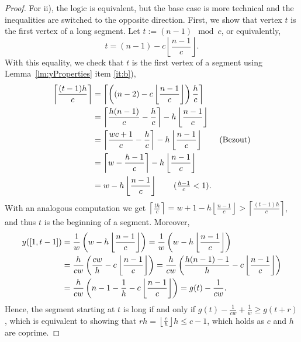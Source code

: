 \documentclass[11pt]{article}
\newcommand\+{\mkern2mu}
\newcommand{\floor}[1]{\left\lfloor #1 \right\rfloor}
\newcommand{\ceil}[1]{\left\lceil #1 \right\rceil}
\begin{document}
\begin{proof}
    For ii), the logic is equivalent, but the base case is more technical and the inequalities are switched to the opposite direction. First, we show that vertex $t$ is the first vertex of a long segment. Let $t:=(n-1) \mod c$, or equivalently, 
    $$t  = (n-1) - c \floor{\frac{n-1}{c}}.$$
    With this equality, we check that $t$ is the first vertex of a segment using Lemma~\ref{lm:yProperties} item \ref{it:b}),
    \begin{align*}
        \ceil{ \frac{(t-1)h}{c}} &= \ceil{\left((n-2) - c \floor{\frac{n-1}{c}} \right)\frac{h}{c}} \\
        &= \ceil{\frac{h(n-1)}{c} - \frac{h}{c}} - h \floor{\frac{n-1}{c}} \\
        &= \ceil{\frac{wc + 1}{c} - \frac{h}{c}} - h \floor{\frac{n-1}{c}} \tag{Bezout}\\
        &= \ceil{w - \frac{h-1}{c}} - h \floor{\frac{n-1}{c}} \\
        &= w - h  \floor{\frac{n-1}{c}} \tag{$\frac{h-1}{c} < 1$}.
    \end{align*}
    With an analogous computation we get $\ceil{ \frac{th}{c}} = w+1- h  \floor{\frac{n-1}{c}} > \ceil{ \frac{(t-1)h}{c}}$, and thus $t$ is the beginning of a segment. Moreover, 
    \begin{align}
    y([1,t-1]) &=  \frac{1}{w}\left(w - h  \floor{\frac{n-1}{c}}\right) = \frac{1}{w}\left(w - h  \floor{\frac{n-1}{c}}\right) \notag\\
    & = \frac{h}{cw}\left(\frac{cw}{h} - c\floor{\frac{n-1}{c}}\right) = \frac{h}{cw}\left(\frac{h(n-1)-1}{h} - c\floor{\frac{n-1}{c}}\right) \notag\\
    &= \frac{h}{cw}\left(n-1 - \frac{1}{h} - c\floor{\frac{n-1}{c}}\right) = g(t) - \frac{1}{cw} \label{eq: thin window}.
    \end{align}
    Hence, the segment starting at $t$ is long if and only if $g(t) - \frac{1}{cw} + \frac{1}{w} \ge g(t+r)$, which is equivalent to showing that $rh = \floor{\frac{c}{h}} h \le c-1$, which holds as $c$ and $h$ are coprime. 


\end{proof}
\end{document}
